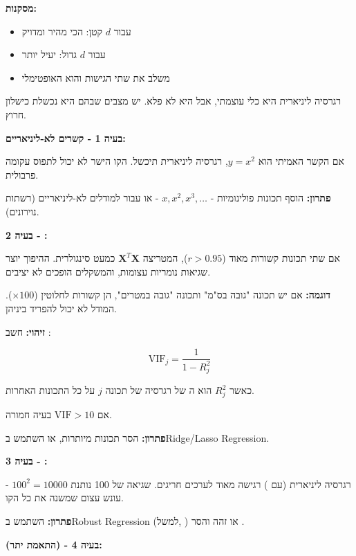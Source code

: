 \textbf{מסקנות:}

\begin{itemize}
\item עבור $d$ קטן:  הכי מהיר ומדויק
\item עבור $d$ גדול:  יעיל יותר
\item {} משלב את שתי הגישות והוא האופטימלי
\end{itemize}


רגרסיה ליניארית היא כלי עוצמתי, אבל היא לא פלא. יש מצבים שבהם היא נכשלת כישלון חרוץ.

\textbf{בעיה \num{1} - קשרים לא-ליניאריים:}

אם הקשר האמיתי הוא $y = x^2$, רגרסיה ליניארית תיכשל. הקו הישר לא יכול לתפוס עקומה פרבולית.

\textbf{פתרון:} הוסף תכונות פולינומיות - $x, x^2, x^3, \ldots$ - או עבור למודלים לא-ליניאריים (רשתות נוירונים).

\textbf{בעיה \num{2} - :}

אם שתי תכונות קשורות מאוד ($r > 0.95$), המטריצה $\mathbf{X}^T\mathbf{X}$ כמעט סינגולרית. ההיפוך יוצר שגיאות נומריות עצומות, והמשקלים הופכים לא יציבים.

\textbf{דוגמה:} אם יש תכונה "גובה בס"מ" ותכונה "גובה במטרים", הן קשורות לחלוטין ($\times 100$). המודל לא יכול להפריד ביניהן.

\textbf{זיהוי:} חשב :

\begin{equation}
\text{VIF}_j = \frac{1}{1 - R_j^2}
\end{equation}

כאשר $R_j^2$ הוא ה\en{-}\Rsquared{} של רגרסיה של תכונה $j$ על כל התכונות האחרות.

אם $\text{VIF} > 10$ \rarrow{} בעיה חמורה.

\textbf{פתרון:} הסר תכונות מיותרות, או השתמש ב\en{-}Ridge/Lasso Regression.

\textbf{בעיה \num{3} - :}

רגרסיה ליניארית (עם ) רגישה מאוד לערכים חריגים. שגיאה של \num{100} נותנת $100^2 = 10000$ - עונש עצום שמשנה את כל הקו.

\textbf{פתרון:} השתמש ב\en{-}Robust Regression (למשל, ) או זהה והסר .

\textbf{בעיה \num{4} -  (התאמת יתר):}

